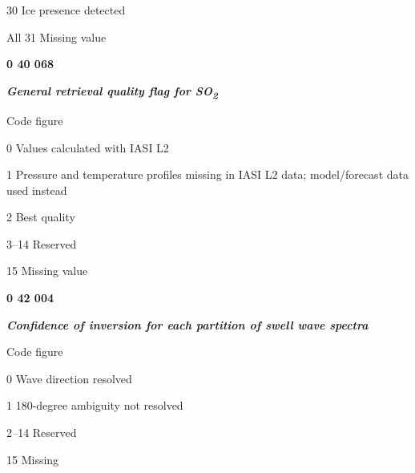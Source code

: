 30 Ice presence detected

All 31 Missing value

\textbf{0 40 068}

\emph{\textbf{General retrieval quality flag for SO\textsubscript{2}}}

Code figure

0 Values calculated with IASI L2

1 Pressure and temperature profiles missing in IASI L2 data; model/forecast data\\
used instead

2 Best quality

3--14 Reserved

15 Missing value

\textbf{0 42 004}

\emph{\textbf{Confidence of inversion for each partition of swell wave spectra}}

Code figure

0 Wave direction resolved

1 180-degree ambiguity not resolved

2\emph{--}14 Reserved

15 Missing
